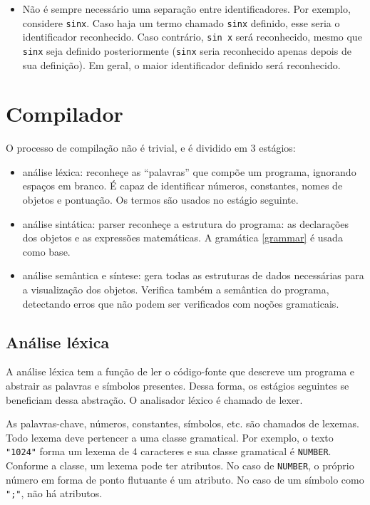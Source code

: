 \begin{itemize}
\item
Não é sempre necessário uma separação entre identificadores.
Por exemplo, considere \texttt{sinx}.
Caso haja um termo chamado \texttt{sinx} definido, esse seria o identificador reconhecido.
Caso contrário, \texttt{sin x} será reconhecido,
mesmo que \texttt{sinx} seja definido posteriormente
(\texttt{sinx} seria reconhecido apenas depois de sua definição).
Em geral, o maior identificador definido será reconhecido.
\end{itemize}

\section{Compilador}
O processo de compilação não é trivial, e é dividido em 3 estágios:
\begin{itemize}
    \item análise léxica: reconheçe as ``palavras'' que compõe um programa,
    ignorando espaços em branco. É capaz de identificar números, 
    constantes, nomes de objetos e pontuação.
    Os termos são usados no estágio seguinte.

    \item análise sintática: parser reconheçe a estrutura do programa:
    as declarações dos objetos e as expressões matemáticas.
    A gramática \ref{grammar} é usada como base.

    \item análise semântica e síntese: gera todas as estruturas de dados
    necessárias para a visualização dos objetos.
    Verifica também a semântica do programa,
    detectando erros que não podem ser verificados com noções gramaticais.
\end{itemize}

\subsection{Análise léxica}
A análise léxica tem a função de ler o código-fonte que descreve um programa
e abstrair as palavras e símbolos presentes.
Dessa forma, os estágios seguintes se beneficiam dessa abstração.
O analisador léxico é chamado de lexer.

As palavras-chave, números, constantes, símbolos, etc. são chamados de lexemas.
Todo lexema deve pertencer a uma classe gramatical.
Por exemplo, o texto \texttt{"1024"} forma um lexema de 4 caracteres
e sua classe gramatical é \texttt{NUMBER}.
Conforme a classe, um lexema pode ter atributos.
No caso de \texttt{NUMBER}, o próprio número em forma de ponto flutuante é um atributo.
No caso de um símbolo como \texttt{";"}, não há atributos.

